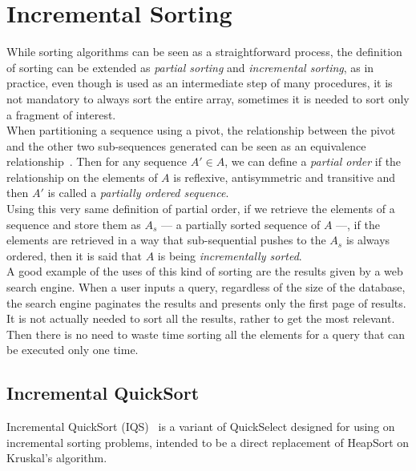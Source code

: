 
\section{Incremental Sorting}
\label{SEC:INCREMENTAL_SORTING}

While sorting algorithms can be seen as a straightforward process, the definition of sorting can be extended as \textit{partial sorting} and \textit{incremental sorting}, as in practice, even though is used as an intermediate step of many procedures, it is not mandatory to always sort the entire array, sometimes it is needed to sort only a fragment of interest.\\

When partitioning a sequence using a pivot, the relationship between the pivot and the other two sub-sequences generated can be seen as an equivalence relationship~\cite{10.5555/1614191}. Then for any sequence $A' \in A$, we can define a \textit{partial order} if the relationship on the elements of $A$ is reflexive, antisymmetric and transitive and then $A'$ is called a \textit{partially ordered sequence}.\\

Using this very same definition of partial order, if we retrieve the elements of a sequence and store them as $A_s$ --- a partially sorted sequence of $A$ ---, if the elements are retrieved in a way that sub-sequential pushes to the $A_s$ is always ordered, then it is said that $A$ is being \textit{incrementally sorted}.\\

A good example of the uses of this kind of sorting are the results given by a web search engine. When a user inputs a query, regardless of the size of the database, the search engine paginates the results and presents only the first page of results. It is not actually needed to sort all the results, rather to get the most relevant. Then there is no need to waste time sorting all the elements for a query that can be executed only one time.\\

\subsection{Incremental QuickSort}
Incremental QuickSort (IQS)~\cite{Navarro_Paredes_2010} is a variant of QuickSelect designed for using on incremental sorting problems, intended to be a direct replacement of HeapSort on Kruskal's algorithm.\\

